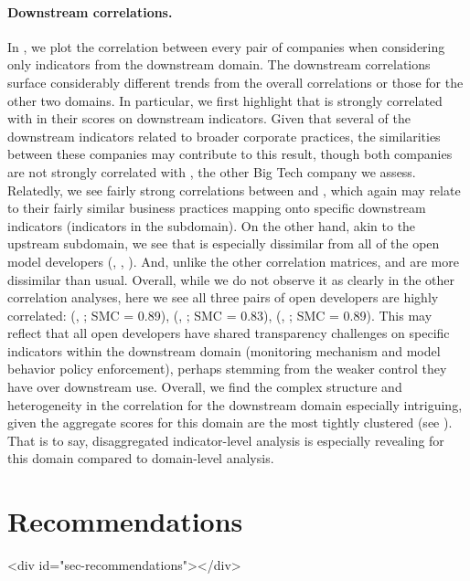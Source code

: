 \documentclass[screen, authorversion, acmsmall]{acmart}
\begin{document}
\paragraph{Downstream correlations.}
In , we plot the correlation between every pair of companies when considering only indicators from the downstream domain.
The downstream correlations surface considerably different trends from the overall correlations or those for the other two domains.
In particular, we first highlight that \meta is strongly correlated with \google in their scores on downstream indicators.
Given that several of the downstream indicators related to broader corporate practices, the similarities between these companies may contribute to this result, though both companies are not strongly correlated with \amazon, the other Big Tech company we assess.
Relatedly, we see fairly strong correlations between \openai and \anthropic, which again may relate to their fairly similar business practices mapping onto specific downstream indicators (\eg indicators in the \modelbehaviorpolicy subdomain).
On the other hand, akin to the upstream subdomain, we see that \inflection is especially dissimilar from all of the open model developers (\meta, \huggingface, \stability). 
And, unlike the other correlation matrices, \openai and \amazon are more dissimilar than usual. 
Overall, while we do not observe it as clearly in the other correlation analyses, here we see all three pairs of open developers are highly correlated:
(\meta, \huggingface; SMC = 0.89),
(\meta, \stability; SMC = 0.83),
(\huggingface, \stability; SMC = 0.89).
This may reflect that all open developers have shared transparency challenges on specific indicators within the downstream domain (\eg monitoring mechanism and model behavior policy enforcement), perhaps stemming from the weaker control they have over downstream use. 
Overall, we find the complex structure and heterogeneity in the correlation for the downstream domain especially intriguing, given the aggregate scores for this domain are the most tightly clustered (see ).
That is to say, disaggregated indicator-level analysis is especially revealing for this domain compared to domain-level analysis.

\clearpage
{}

\hypertarget{recommendations}{\section{Recommendations}}
<div id="sec-recommendations"></div>
\end{document}
